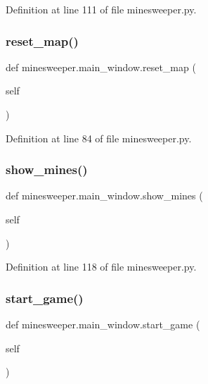 Definition at line 111 of file minesweeper.\+py.

\mbox{\label{classminesweeper_1_1main__window_aea1291809d107de9efaf1b7ed5f939a6}} 
\subsubsection{\texorpdfstring{reset\_map()}{reset\_map()}}
{\footnotesize\ttfamily def minesweeper.\+main\+\_\+window.\+reset\+\_\+map (\begin{DoxyParamCaption}\item[{}]{self }\end{DoxyParamCaption})}



Definition at line 84 of file minesweeper.\+py.

\mbox{\label{classminesweeper_1_1main__window_a6c5274b46e4ea0df40ec603d8afb1960}} 
\subsubsection{\texorpdfstring{show\_mines()}{show\_mines()}}
{\footnotesize\ttfamily def minesweeper.\+main\+\_\+window.\+show\+\_\+mines (\begin{DoxyParamCaption}\item[{}]{self }\end{DoxyParamCaption})}



Definition at line 118 of file minesweeper.\+py.

\mbox{\label{classminesweeper_1_1main__window_a1c63f5ae2b6e8b5a4d2733ee87a3db08}} 
\subsubsection{\texorpdfstring{start\_game()}{start\_game()}}
{\footnotesize\ttfamily def minesweeper.\+main\+\_\+window.\+start\+\_\+game (\begin{DoxyParamCaption}\item[{}]{self }\end{DoxyParamCaption})}



